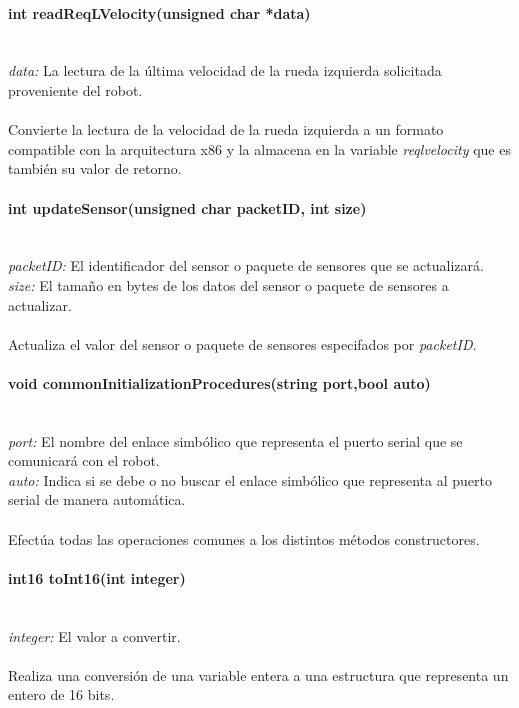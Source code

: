 \documentclass[letterpaper,openright,12pt]{book}
\begin{document}
\paragraph{int readReqLVelocity(unsigned char *data)}\mbox{}\\
\emph{data: }La lectura de la última velocidad de la rueda izquierda solicitada proveniente del robot.\\\\
Convierte la lectura de la velocidad de la rueda izquierda a un formato compatible con la arquitectura x86 y la almacena en la variable \emph{reqlvelocity} que es también su valor de retorno.\\ 

\paragraph{int updateSensor(unsigned char packetID, int size)}\mbox{}\\
\emph{packetID: }El identificador del sensor o paquete de sensores que se actualizará.\\
\emph{size: }El tamaño en bytes de los datos del sensor o paquete de sensores a actualizar.\\\\
Actualiza el valor del sensor o paquete de sensores especifados por \emph{packetID}.\\

\paragraph{void commonInitializationProcedures(string port,bool auto)}\mbox{}\\
\emph{port: }El nombre del enlace simbólico que representa el puerto serial que se comunicará con el robot.\\
\emph{auto: }Indica si se debe o no buscar el enlace simbólico que representa al puerto serial de manera automática.\\\\
Efectúa todas las operaciones comunes a los distintos métodos constructores.

\paragraph{int16 toInt16(int integer)}\mbox{}\\
\emph{integer: }El valor a convertir.\\\\
Realiza una conversión de una variable entera a una estructura que representa un entero de 16 bits.
\end{document}
